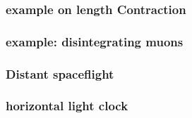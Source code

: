 \subsubsection{example on length Contraction}
\subsubsection{example: disintegrating muons}
\subsubsection{Distant spaceflight}
\subsubsection{horizontal light clock}

\subsection{}
